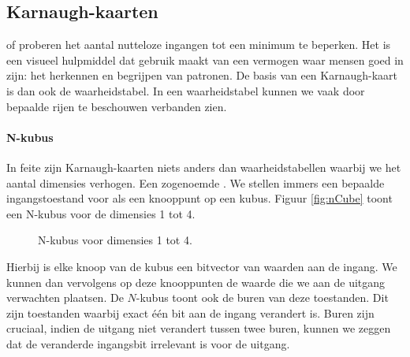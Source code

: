 \subsection{Karnaugh-kaarten}
 of  proberen het aantal nutteloze ingangen tot een minimum te beperken. Het is een visueel hulpmiddel dat gebruik maakt van een vermogen waar mensen goed in zijn: het herkennen en begrijpen van patronen. De basis van een Karnaugh-kaart is dan ook de waarheidstabel. In een waarheidstabel kunnen we vaak door bepaalde rijen te beschouwen verbanden zien.
\paragraph{N-kubus}In feite zijn Karnaugh-kaarten niets anders dan waarheidstabellen waarbij we het aantal dimensies verhogen. Een zogenoemde . We stellen immers een bepaalde ingangstoestand voor als een knooppunt op een kubus. Figuur \ref{fig:nCube} toont een N-kubus voor de dimensies 1 tot 4.
\begin{figure}[htb]
\centering
{}
\caption{N-kubus voor dimensies 1 tot 4.}
\end{figure}
Hierbij is elke knoop van de kubus een bitvector van waarden aan de ingang. We kunnen dan vervolgens op deze knooppunten de waarde die we aan de uitgang verwachten plaatsen. De $N$-kubus toont ook de buren van deze toestanden. Dit zijn toestanden waarbij exact \'e\'en bit aan de ingang verandert is. Buren zijn cruciaal, indien de uitgang niet verandert tussen twee buren, kunnen we zeggen dat de veranderde ingangsbit irrelevant is voor de uitgang.
